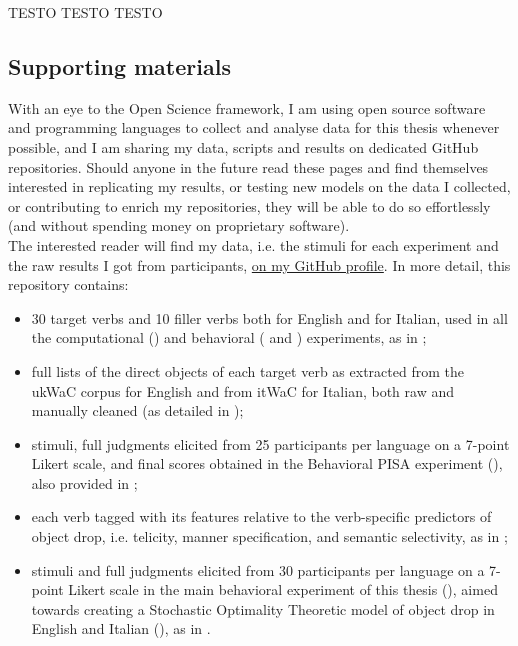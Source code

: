 TESTO TESTO TESTO

\subsection{Supporting materials}
With an eye to the Open Science framework, I am using open source software and programming languages to collect and analyse data for this thesis whenever possible, and I am sharing my data, scripts and results on dedicated GitHub repositories. Should anyone in the future read these pages and find themselves interested in replicating my results, or testing new models on the data I collected, or contributing to enrich my repositories, they will be able to do so effortlessly (and without spending money on proprietary software).\\
The interested reader will find my data, i.e. the stimuli for each experiment and the raw results I got from participants, \href{https://github.com/giuliacappelli/dissertationData}{on my GitHub profile}. In more detail, this repository contains:
\begin{itemize}
    \item 30 target verbs and 10 filler verbs both for English and for Italian, used in all the computational () and behavioral ( and ) experiments, as in ;
    \item full lists of the direct objects of each target verb as extracted from the ukWaC corpus for English and from itWaC for Italian, both raw and manually cleaned (as detailed in );
    \item stimuli, full judgments elicited from 25 participants per language on a 7-point Likert scale, and final scores obtained in the Behavioral PISA experiment (), also provided in ;
    \item each verb tagged with its features relative to the verb-specific predictors of object drop, i.e. telicity, manner specification, and semantic selectivity, as in ;
    \item stimuli and full judgments elicited from 30 participants per language on a 7-point Likert scale in the main behavioral experiment of this thesis (), aimed towards creating a Stochastic Optimality Theoretic model of object drop in English and Italian (), as in .
\end{itemize}
